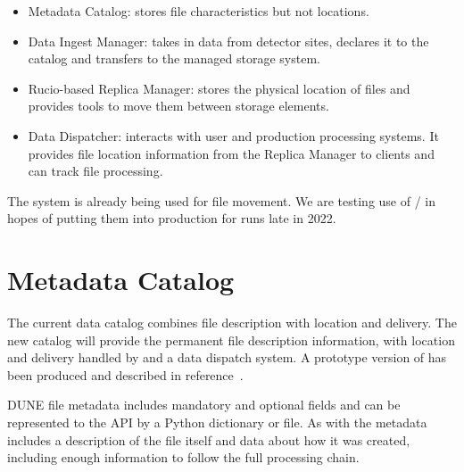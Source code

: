 \documentclass[../main-v1.tex]{subfiles}
\begin{document}
\begin{itemize}
\item Metadata Catalog: stores file characteristics but not locations.    
    \item Data Ingest Manager: takes in data from detector sites, declares it to the catalog and transfers to the managed storage system.
    \item Rucio-based Replica Manager: stores the physical location of files and provides tools to move them between storage elements. 
    \item Data Dispatcher: interacts with user and production processing systems.  It provides file location information from the Replica Manager to clients and can track file processing. 
\end{itemize}

The  system is already being used for file movement.  We are testing use of / in hopes of putting them into production for  runs late in 2022. 


\section{Metadata Catalog }

The current  data catalog combines file description with location and delivery.  The new  catalog will provide the permanent file description information, with location and delivery handled by  and a data dispatch system. 
A prototype version of  has been produced and described in reference~\cite{Mandrichenko:2021spd}. 

DUNE file metadata includes mandatory and optional fields and can be represented to the API by a Python dictionary or  file. 
As with  the metadata includes a description of the file itself and data about how it was created, including enough information to follow the full processing chain.   
\end{document}

